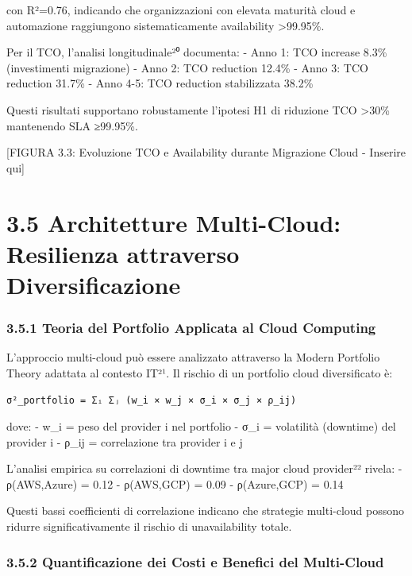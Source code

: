 \documentclass{report}
\begin{document}
con R²=0.76, indicando che organizzazioni con elevata maturità cloud e
automazione raggiungono sistematicamente availability
\textgreater99.95\%.

Per il TCO, l'analisi longitudinale²⁰ documenta: - Anno 1: TCO increase
8.3\% (investimenti migrazione) - Anno 2: TCO reduction 12.4\% - Anno 3:
TCO reduction 31.7\% - Anno 4-5: TCO reduction stabilizzata 38.2\%

Questi risultati supportano robustamente l'ipotesi H1 di riduzione TCO
\textgreater30\% mantenendo SLA ≥99.95\%.

{[}FIGURA 3.3: Evoluzione TCO e Availability durante Migrazione Cloud -
Inserire qui{]}

\section{3.5 Architetture Multi-Cloud: Resilienza attraverso
Diversificazione}\label{architetture-multi-cloud-resilienza-attraverso-diversificazione}

\subsubsection{3.5.1 Teoria del Portfolio Applicata al Cloud
Computing}\label{teoria-del-portfolio-applicata-al-cloud-computing}

L'approccio multi-cloud può essere analizzato attraverso la Modern
Portfolio Theory adattata al contesto IT²¹. Il rischio di un portfolio
cloud diversificato è:

\begin{verbatim}
σ²_portfolio = Σᵢ Σⱼ (w_i × w_j × σ_i × σ_j × ρ_ij)
\end{verbatim}

dove: - w\_i = peso del provider i nel portfolio - σ\_i = volatilità
(downtime) del provider i - ρ\_ij = correlazione tra provider i e j

L'analisi empirica su correlazioni di downtime tra major cloud
provider²² rivela: - ρ(AWS,Azure) = 0.12 - ρ(AWS,GCP) = 0.09 -
ρ(Azure,GCP) = 0.14

Questi bassi coefficienti di correlazione indicano che strategie
multi-cloud possono ridurre significativamente il rischio di
unavailability totale.

\subsubsection{3.5.2 Quantificazione dei Costi e Benefici del
Multi-Cloud}\label{quantificazione-dei-costi-e-benefici-del-multi-cloud}
\end{document}

